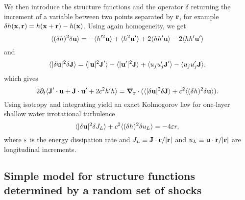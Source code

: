 %
We then introduce the structure functions and the operator $\delta$
returning the increment of a variable between two points separated by $\textbf{r}$, 
for example $\delta h (\textbf{x}, \textbf{r}) = h(\textbf{x}+\textbf{r})- h(\textbf{x})$.
%
Using again homogeneity, we get
\begin{equation}
\langle  (\delta h)^2 \delta\textbf{u}  \rangle = 
-\langle  h'^2 \textbf{u}  \rangle + \langle  h^2 \textbf{u}'  \rangle
+2\langle  hh' \textbf{u}  \rangle - 2\langle  hh' \textbf{u}'  \rangle
\end{equation}
and 
\begin{equation}
\langle  |\delta \textbf{u}|^2 \delta\textbf{J}  \rangle = 
\langle   |\textbf{u}|^2 \textbf{J}'  \rangle - \langle  |\textbf{u}'|^2\textbf{J}  \rangle
+\langle  u_ju_j' \textbf{J}'  \rangle - \langle   u_ju_j' \textbf{J}  \rangle,
\end{equation}
which gives
\begin{equation}
2\partial_t \langle  \textbf{J}'\cdot\textbf{u} + \textbf{J}\cdot\textbf{u}' + 2c^2 h'h  \rangle
= \boldsymbol{\nabla}_{\textbf{r}} \cdot ( \langle  |\delta \textbf{u}|^2 \delta\textbf{J}  \rangle 
+ c^2\langle  (\delta h)^2 \delta\textbf{u}  \rangle ).
\end{equation}
Using isotropy and integrating yield an exact Kolmogorov law for
one-layer shallow water irrotational turbulence
\begin{equation}
\langle  |\delta \textbf{u}|^2 \delta J_L  \rangle 
+ c^2\langle  (\delta h)^2 \delta u_L  \rangle = -4 \varepsilon r, \label{eq_Kolmo}
\end{equation}
where $\varepsilon$ is the energy dissipation rate and $J_L \equiv
\textbf{J}\cdot\textbf{r} / |\textbf{r}|$ and $u_L \equiv \textbf{u}\cdot\textbf{r} / |\textbf{r}|$ are
longitudinal increments.







\subsection{Simple model for structure functions determined by a
random set of shocks}
\label{subsection_shock_model}


